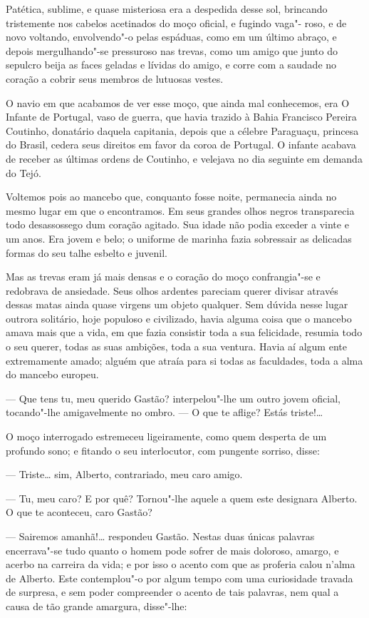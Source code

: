 Patética, sublime, e quase misteriosa era a despedida desse sol,
brincando tristemente nos cabelos acetinados do moço oficial, e fugindo
vaga"- roso, e de novo voltando, envolvendo"-o pelas espáduas, como em um
último abraço, e depois mergulhando"-se pressuroso nas trevas, como um
amigo que junto do sepulcro beija as faces geladas e lívidas do amigo, e
corre com a saudade no coração a cobrir seus membros de lutuosas vestes.

O navio em que acabamos de ver esse moço, que ainda mal conhecemos, era
O Infante de Portugal, vaso de guerra, que havia trazido à Bahia
Francisco Pereira Coutinho, donatário daquela capitania, depois que a
célebre Paraguaçu, princesa do Brasil, cedera seus direitos em favor da
coroa de Portugal. O infante acabava de receber as últimas ordens de
Coutinho, e velejava no dia seguinte em demanda do Tejó.

Voltemos pois ao mancebo que, conquanto fosse noite, permanecia ainda no
mesmo lugar em que o encontramos. Em seus grandes olhos negros
transparecia todo desassossego dum coração agitado. Sua idade não podia
exceder a vinte e um anos. Era jovem e belo; o uniforme de marinha fazia
sobressair as delicadas formas do seu talhe esbelto e juvenil.

Mas as trevas eram já mais densas e o coração do moço confrangia"-se e
redobrava de ansiedade. Seus olhos ardentes pareciam querer divisar
através dessas matas ainda quase virgens um objeto qualquer. Sem dúvida
nesse lugar outrora solitário, hoje populoso e civilizado, havia alguma
coisa que o mancebo amava mais que a vida, em que fazia consistir toda a
sua felicidade, resumia todo o seu querer, todas as suas ambições, toda
a sua ventura. Havia aí algum ente extremamente amado; alguém que atraía
para si todas as faculdades, toda a alma do mancebo europeu.

--- Que tens tu, meu querido Gastão? interpelou"-lhe um outro jovem
oficial, tocando"-lhe amigavelmente no ombro. --- O que te aflige? Estás
triste!\ldots{}

O moço interrogado estremeceu ligeiramente, como quem desperta de um
profundo sono; e fitando o seu interlocutor, com pungente sorriso,
disse:

--- Triste\ldots{} sim, Alberto, contrariado, meu caro amigo.

--- Tu, meu caro? E por quê? Tornou"-lhe aquele a quem este designara
Alberto. O que te aconteceu, caro Gastão?

--- Sairemos amanhã!\ldots{} respondeu Gastão. Nestas duas únicas palavras
encerrava"-se tudo quanto o homem pode sofrer de mais doloroso, amargo, e
acerbo na carreira da vida; e por isso o acento com que as proferia
calou n'alma de Alberto. Este contemplou"-o por algum tempo com uma
curiosidade travada de surpresa, e sem poder compreender o acento de
tais palavras, nem qual a causa de tão grande amargura, disse"-lhe:

